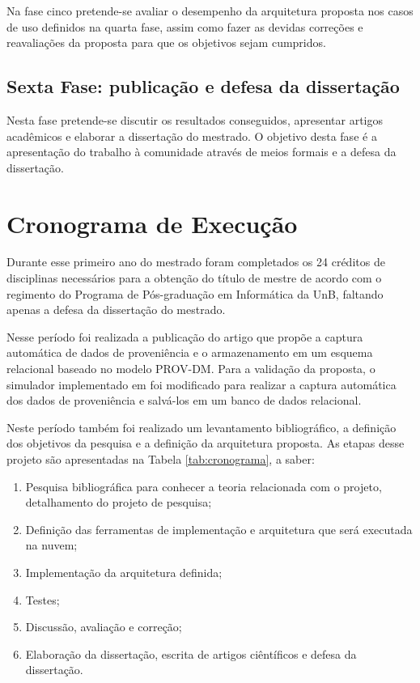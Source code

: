 Na fase cinco pretende-se avaliar o desempenho da arquitetura proposta
nos casos de uso definidos na quarta fase, assim como fazer as devidas
correções e reavaliações da proposta para que os objetivos sejam cumpridos. 


\subsection{Sexta Fase: publicação e defesa da dissertação}

Nesta fase pretende-se discutir os resultados conseguidos, apresentar artigos acadêmicos e elaborar a dissertação do mestrado. O objetivo desta fase é a apresentação do trabalho à comunidade através de meios formais e a defesa da dissertação. 

\section{Cronograma de Execução}

Durante esse primeiro ano do mestrado foram completados os 24 créditos de
disciplinas necessários para a obtenção do título de mestre de acordo
com o regimento do Programa de Pós-graduação em Informática da UnB,
faltando apenas a defesa da dissertação do mestrado. 

Nesse período foi realizada a publicação do artigo \cite{rodrigo} que
propõe a captura automática de dados de proveniência e o armazenamento
em um esquema relacional baseado no modelo PROV-DM. Para a validação da proposta, o simulador implementado em \cite{renato} foi modificado para realizar a captura automática dos dados de proveniência e salvá-los em um banco de dados relacional.

Neste período também foi realizado um levantamento bibliográfico, a definição
dos objetivos da pesquisa e a definição da arquitetura proposta. As etapas desse projeto são apresentadas na Tabela \ref{tab:cronograma}, a saber:

 	\begin{enumerate}
    \item Pesquisa bibliográfica para conhecer a teoria relacionada com o projeto, detalhamento do projeto de pesquisa;
    \item Definição das ferramentas de implementação  e arquitetura que será executada na nuvem; 
    \item Implementação da arquitetura definida;
    \item Testes;
    \item Discussão, avaliação e correção;
    \item Elaboração da dissertação, escrita de artigos ciêntíficos e defesa da dissertação.

    \end{enumerate}

